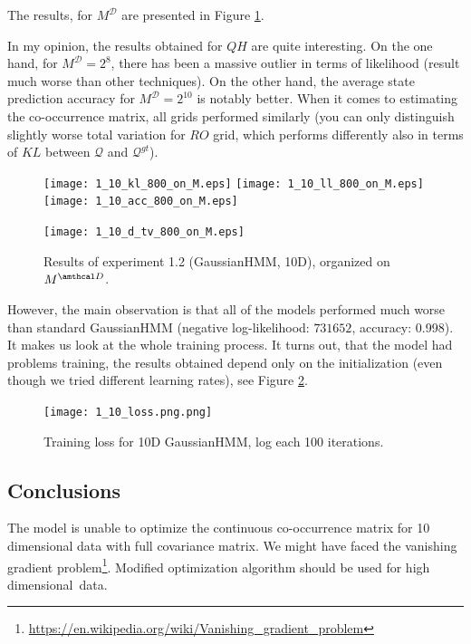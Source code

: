 \documentclass[shortabstract]{iithesis}
\begin{document}
The results, for $M^{\mathcal D}$ are presented in Figure \ref{fig:ex1_10_res_on_M}. 

In my opinion, the results obtained for $QH$ are quite interesting. On the one hand, for $M^{\mathcal D} = 2^8$, there has been a massive outlier in terms of likelihood (result much worse than other techniques). On the other hand, the average state prediction accuracy for  $M^{\mathcal D} = 2^10$ is notably better. When it comes to estimating the co-occurrence matrix, all grids performed similarly (you can only distinguish slightly worse total variation for $RO$ grid, which performs differently also in terms of $KL$ between $\mathcal Q$ and $\mathcal Q^{gt}$). 

\pagebreak
\begin{figure}[!h]
    \centering
    \texttt{[image: 1\_10\_kl\_800\_on\_M.eps]}
    \texttt{[image: 1\_10\_ll\_800\_on\_M.eps]}
    \texttt{[image: 1\_10\_acc\_800\_on\_M.eps]}
\end{figure} \pagebreak
\begin{figure}[!ht]\ContinuedFloat
    \centering
    \texttt{[image: 1\_10\_d\_tv\_800\_on\_M.eps]}
    \caption{Results of experiment 1.2 (GaussianHMM, 10D), organized on $M^{\amthcal D}$.}
    \label{fig:ex1_10_res_on_M}
\end{figure}



However, the main observation is that all of the models performed much worse than standard GaussianHMM (negative log-likelihood: $731652$, accuracy: 0.998). It makes us look at the whole training process. It turns out, that the model had problems training, the results obtained depend only on the initialization (even though we tried different learning rates), see Figure \ref{fig:bad_res_1_10}.

\begin{figure}[!hb]
    \centering
    \texttt{[image: 1\_10\_loss.png.png]}
    \caption{Training loss for 10D GaussianHMM, log each 100 iterations.}
    \label{fig:bad_res_1_10}
\end{figure}



\subsection{Conclusions}

The model is unable to optimize the continuous co-occurrence matrix for 10 dimensional data with full covariance matrix. 
We might have faced the vanishing gradient problem\footnote{\href{https://en.wikipedia.org/wiki/Vanishing_gradient_problem}{https://en.wikipedia.org/wiki/Vanishing\_gradient\_problem}}. Modified optimization algorithm should be used for high dimensional~data. 
\end{document}
